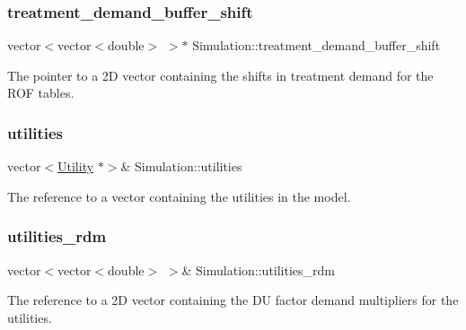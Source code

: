 \subsubsection{\texorpdfstring{treatment\+\_\+demand\+\_\+buffer\+\_\+shift}{treatment\_demand\_buffer\_shift}}
{\footnotesize\ttfamily vector$<$vector$<$double$>$ $>$$\ast$ Simulation\+::treatment\+\_\+demand\+\_\+buffer\+\_\+shift\hspace{0.3cm}{\ttfamily [private]}}



The pointer to a 2D vector containing the shifts in treatment demand for the R\+OF tables. 

\mbox{\label{classSimulation_a0de77bedebd4b324d334340b11f5afa6}} 
\subsubsection{\texorpdfstring{utilities}{utilities}}
{\footnotesize\ttfamily vector$<$\mbox{\hyperlink{classUtility}{Utility}} $\ast$$>$\& Simulation\+::utilities\hspace{0.3cm}{\ttfamily [private]}}



The reference to a vector containing the utilities in the model. 

\mbox{\label{classSimulation_a0e0766513f36e2e95e83b0611c3c078c}} 
\subsubsection{\texorpdfstring{utilities\+\_\+rdm}{utilities\_rdm}}
{\footnotesize\ttfamily vector$<$vector$<$double$>$ $>$\& Simulation\+::utilities\+\_\+rdm\hspace{0.3cm}{\ttfamily [private]}}



The reference to a 2D vector containing the DU factor demand multipliers for the utilities. 

\mbox{\label{classSimulation_a7cf5edb885d26074e51e183408a3adab}} 
